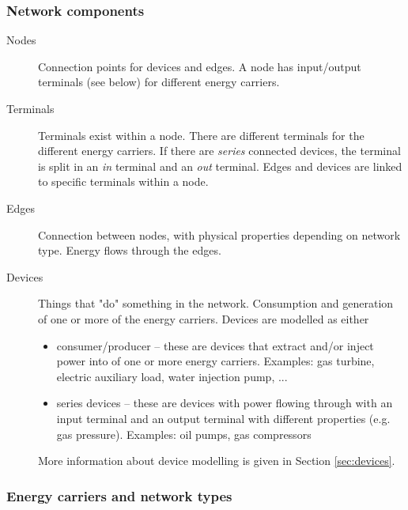 \documentclass[12pt]{article}
\begin{document}
\subsubsection{Network components}

\begin{description}
\item[Nodes]
Connection points for devices and edges. A node has input/output terminals (see below) for different energy carriers. 

\item[Terminals]
Terminals exist within a node. There are different terminals for the different energy carriers. If there are \textit{series} connected devices, the terminal is split in an \textit{in} terminal and an \textit{out} terminal. Edges and devices are linked to specific terminals within a node.

\item[Edges]
Connection between nodes, with physical properties depending on network type. Energy flows through the edges.

\item[Devices]
Things that "do" something in the network. Consumption and generation of one or more of the energy carriers. Devices are modelled as either
\begin{itemize}
	\item consumer/producer – these are devices that extract and/or inject power into of one or more energy carriers. Examples: gas turbine, electric auxiliary load, water injection pump, ...
	\item series devices – these are devices with power flowing through with an input terminal and an output terminal with different properties (e.g. gas pressure). Examples: oil pumps, gas compressors
\end{itemize}
More information about device modelling is given in Section \ref{sec:devices}.
\end{description}

\subsubsection{Energy carriers and network types}
\end{document}
